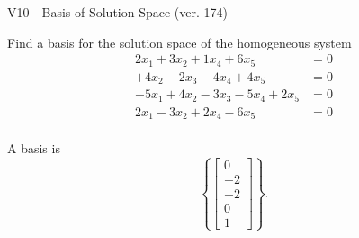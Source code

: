 \begin{exercise}
  \begin{exerciseTitle}V10 - Basis of Solution Space (ver. 174)\end{exerciseTitle}
  \begin{exerciseStatement}
    Find a basis for the solution space of the homogeneous system 
\begin{align*}
 2 x_ 1 + 3 x_ 2 + 1 x_ 4 + 6 x_ 5 &= 0  \\ 
  + 4 x_ 2 -2 x_ 3 -4 x_ 4 + 4 x_ 5 &= 0  \\ 
  -5 x_ 1 + 4 x_ 2 -3 x_ 3 -5 x_ 4 + 2 x_ 5 &= 0  \\ 
  2 x_ 1 -3 x_ 2 + 2 x_ 4 -6 x_ 5 &= 0  \\ 
 \end{align*}


 
  \end{exerciseStatement}

  \begin{exerciseAnswer}
   A basis is   
\[\left\{\left[\begin{array}{c}
0 \\
-2 \\
-2 \\
0 \\
1
\end{array}\right]\right\}.\]

  


  \end{exerciseAnswer}
\end{exercise}